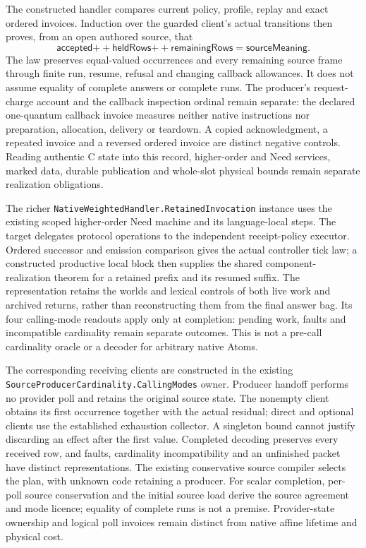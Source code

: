 \documentclass[11pt]{article}
\theoremstyle{definition}
\theoremstyle{remark}
\begin{document}
The constructed handler compares current policy, profile, replay and exact
ordered invoices.  Induction over the guarded client's actual transitions
then proves, from an open authored source, that
\[
  \mathsf{accepted}
    \mathbin{+\!+}\mathsf{heldRows}
    \mathbin{+\!+}\mathsf{remainingRows}
      = \mathsf{sourceMeaning}.
\]
The law preserves equal-valued occurrences and every remaining source frame
through finite run, resume, refusal and changing callback allowances.  It
does not assume equality of complete answers or complete runs.  The producer's
request-charge account and the callback inspection ordinal remain separate:
the declared one-quantum callback invoice measures neither native instructions
nor preparation, allocation, delivery or teardown.  A copied acknowledgment,
a repeated invoice and a reversed ordered invoice are distinct negative
controls.  Reading authentic C state into this record, higher-order and Need
services, marked data, durable publication and whole-slot physical bounds
remain separate realization obligations.

The richer \nolinkurl{NativeWeightedHandler.RetainedInvocation} instance uses
the existing scoped higher-order Need machine and its language-local steps.
The target delegates protocol operations to the independent receipt-policy
executor. Ordered successor and emission comparison gives the actual
controller tick law; a constructed productive local block then supplies the
shared component-realization theorem for a retained prefix and its resumed
suffix. The representation retains the worlds and lexical controls of both
live work and archived returns, rather than reconstructing them from the final
answer bag. Its four calling-mode readouts apply only at completion: pending
work, faults and incompatible cardinality remain separate outcomes. This is
not a pre-call cardinality oracle or a decoder for arbitrary native Atoms.

The corresponding receiving clients are constructed in the existing
\nolinkurl{SourceProducerCardinality.CallingModes} owner. Producer handoff
performs no provider poll and retains the original source state. The nonempty
client obtains its first occurrence together with the actual residual;
direct and optional clients use the established exhaustion collector. A
singleton bound cannot justify discarding an effect after the first value.
Completed decoding preserves every received row, and faults, cardinality
incompatibility and an unfinished packet have distinct representations. The
existing conservative source compiler selects the plan, with unknown code
retaining a producer. For scalar completion, per-poll source conservation
and the initial source load derive the source agreement and mode licence;
equality of complete runs is not a premise. Provider-state ownership and
logical poll invoices remain distinct from native affine lifetime and
physical cost.
\end{document}
